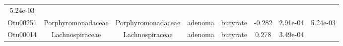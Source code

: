 \documentclass[11pt,]{article}
\begin{document}
\begin{longtable}[]{@{}cccccccc@{}}
\begin{minipage}[t]{0.08\columnwidth}
5.24e-03\strut
\end{minipage}\tabularnewline
\begin{minipage}[t]{0.08\columnwidth}\centering\strut
Otu00251\strut
\end{minipage} & \begin{minipage}[t]{0.15\columnwidth}\centering\strut
Porphyromonadaceae\strut
\end{minipage} & \begin{minipage}[t]{0.15\columnwidth}\centering\strut
Porphyromonadaceae\strut
\end{minipage} & \begin{minipage}[t]{0.08\columnwidth}\centering\strut
adenoma\strut
\end{minipage} & \begin{minipage}[t]{0.09\columnwidth}\centering\strut
butyrate\strut
\end{minipage} & \begin{minipage}[t]{0.07\columnwidth}\centering\strut
-0.282\strut
\end{minipage} & \begin{minipage}[t]{0.08\columnwidth}\centering\strut
2.91e-04\strut
\end{minipage} & \begin{minipage}[t]{0.08\columnwidth}\centering\strut
5.24e-03\strut
\end{minipage}\tabularnewline
\begin{minipage}[t]{0.08\columnwidth}\centering\strut
Otu00014\strut
\end{minipage} & \begin{minipage}[t]{0.15\columnwidth}\centering\strut
Lachnospiraceae\strut
\end{minipage} & \begin{minipage}[t]{0.15\columnwidth}\centering\strut
Lachnospiraceae\strut
\end{minipage} & \begin{minipage}[t]{0.08\columnwidth}\centering\strut
adenoma\strut
\end{minipage} & \begin{minipage}[t]{0.09\columnwidth}\centering\strut
butyrate\strut
\end{minipage} & \begin{minipage}[t]{0.07\columnwidth}\centering\strut
0.278\strut
\end{minipage} & \begin{minipage}[t]{0.08\columnwidth}\centering\strut
3.49e-04\strut
\end{minipage} & \begin{minipage}[t]{0.08\columnwidth}\centering\strut

\end{minipage}
\end{longtable}
\end{document}
